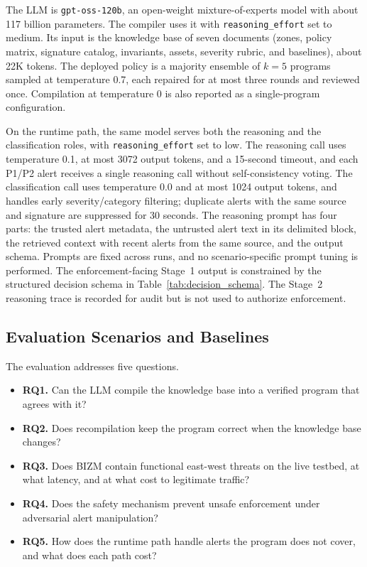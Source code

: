 \documentclass[final,5p]{elsarticle}
\begin{document}
The LLM is \texttt{gpt-oss-120b}, an open-weight mixture-of-experts model with about 117 billion parameters. The compiler uses it with \texttt{reasoning\_effort} set to medium. Its input is the knowledge base of seven documents (zones, policy matrix, signature catalog, invariants, assets, severity rubric, and baselines), about 22K tokens. The deployed policy is a majority ensemble of $k=5$ programs sampled at temperature 0.7, each repaired for at most three rounds and reviewed once. Compilation at temperature 0 is also reported as a single-program configuration.

On the runtime path, the same model serves both the reasoning and the classification roles, with \texttt{reasoning\_effort} set to low. The reasoning call uses temperature 0.1, at most 3072 output tokens, and a 15-second timeout, and each P1/P2 alert receives a single reasoning call without self-consistency voting. The classification call uses temperature 0.0 and at most 1024 output tokens, and handles early severity/category filtering; duplicate alerts with the same source and signature are suppressed for 30 seconds. The reasoning prompt has four parts: the trusted alert metadata, the untrusted alert text in its delimited block, the retrieved context with recent alerts from the same source, and the output schema. Prompts are fixed across runs, and no scenario-specific prompt tuning is performed. The enforcement-facing Stage~1 output is constrained by the structured decision schema in Table~\ref{tab:decision_schema}. The Stage~2 reasoning trace is recorded for audit but is not used to authorize enforcement.

\subsection{Evaluation Scenarios and Baselines}
\label{sec:scenarios_baselines}

The evaluation addresses five questions.
\begin{itemize}
    \item \textbf{RQ1.} Can the LLM compile the knowledge base into a verified program that agrees with it?
    \item \textbf{RQ2.} Does recompilation keep the program correct when the knowledge base changes?
    \item \textbf{RQ3.} Does BIZM contain functional east-west threats on the live testbed, at what latency, and at what cost to legitimate traffic?
    \item \textbf{RQ4.} Does the safety mechanism prevent unsafe enforcement under adversarial alert manipulation?
    \item \textbf{RQ5.} How does the runtime path handle alerts the program does not cover, and what does each path cost?
\end{itemize}
\end{document}
